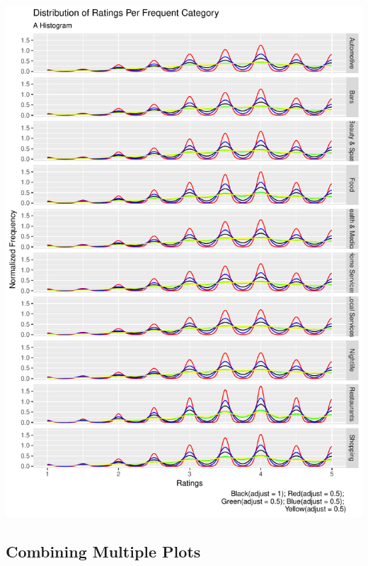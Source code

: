 \documentclass[12pt]{book}\usepackage{knitr}
\begin{document}
\begin{knitrout}
\includegraphics[width=\maxwidth]{figure/Faceted_Density_Plot-1} 

\end{knitrout}

\subsection{Combining Multiple Plots}
\end{document}
